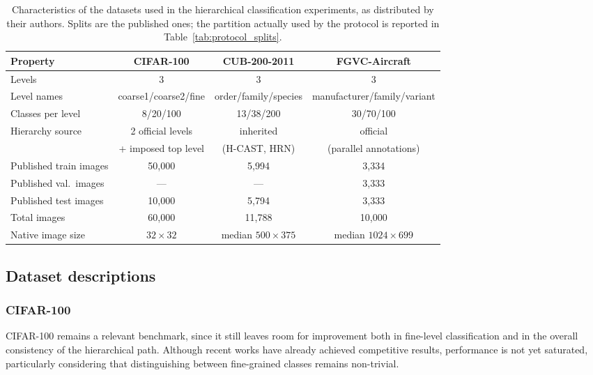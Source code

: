 \begin{table}[ht]
\centering
\caption{Characteristics of the datasets used in the hierarchical classification experiments, as distributed by their authors. Splits are the published ones; the partition actually used by the protocol is reported in Table~\ref{tab:protocol_splits}.}
\label{tab:datasets_info}
\fontsize{8}{11}\selectfont
\begin{tabular}{lccc}
\toprule
\textbf{Property} & \textbf{CIFAR-100} & \textbf{CUB-200-2011} & \textbf{FGVC-Aircraft} \\
\midrule
Levels                 & 3            & 3                     & 3 \\
Level names            & coarse1/coarse2/fine & order/family/species & manufacturer/family/variant \\
Classes per level      & 8/20/100     & 13/38/200             & 30/70/100 \\
Hierarchy source       & 2 official levels    & inherited             & official \\
                       & + imposed top level  & (H-CAST, HRN)         & (parallel annotations) \\
\midrule
Published train images & 50{,}000     & 5{,}994               & 3{,}334 \\
Published val.\ images & ---          & ---                   & 3{,}333 \\
Published test images  & 10{,}000     & 5{,}794               & 3{,}333 \\
Total images           & 60{,}000     & 11{,}788              & 10{,}000 \\
\midrule
Native image size      & $32\times32$ & median $500\times375$ & median $1024\times699$ \\
\bottomrule
\end{tabular}
\end{table}


\subsection{Dataset descriptions}
\label{sec:dataset_descriptions}

\subsubsection{CIFAR-100}
CIFAR-100 remains a relevant benchmark, since it still leaves room for improvement both in fine-level classification and in the overall consistency of the hierarchical path. Although recent works have already achieved competitive results, performance is not yet saturated, particularly considering that distinguishing between fine-grained classes remains non-trivial.

